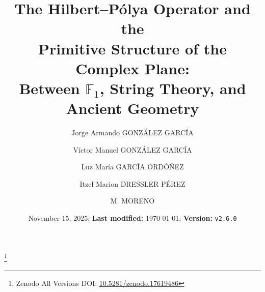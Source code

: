 \documentclass[11pt,reqno]{amsart}
\numberwithin{equation}{section}
\theoremstyle{definition}
\begin{document}
\title[The Hilbert--P\'olya Operator and the Primitive Structure of the Complex Plane]
    {The Hilbert--P\'olya Operator and the \\
    Primitive Structure of the Complex Plane: \\
    Between\/ $\mathbb{F}_1$, String Theory, and Ancient Geometry}
\thanks{Zenodo All Versions DOI: \href{https://doi.org/10.5281/zenodo.17619486}{10.5281/zenodo.17619486}}

\author[J. A. González García et al.]{Jorge Armando GONZÁLEZ GARCÍA}
\author[]{Víctor Manuel GONZÁLEZ GARCÍA}
\author[]{Luz María GARCÍA ORDÓÑEZ}
\address{TTAMAYO PUNTO COM, S.A.P.I. de C.V.; Research \& Development Division; Naucalpan de Juárez, State of Mexico, Mexico}

\author[]{Itzel Marion DRESSLER PÉREZ}
\author[]{M. MORENO}
\address{Independent Researcher}

\renewcommand{\datename}{\textbf{Received:}}
\date{November 15, 2025; \textbf{Last modified:} \today; \textbf{Version:} \texttt{v2.6.0}}



\begin{abstract}

\end{abstract}

\maketitle

\tableofcontents

\pagebreak












\printbibliography
\end{document}
